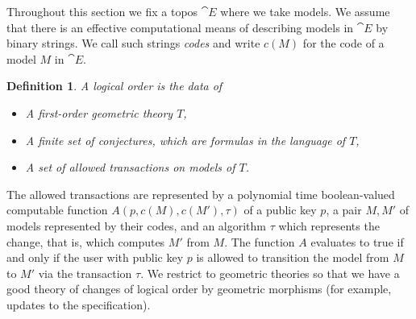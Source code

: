 \documentclass[english,letter paper,12pt,reqno]{article}
\theoremstyle{example}
\newtheorem{definition}[theorem]{Definition}
\newtheorem{example}[theorem]{Example}
\begin{document}
Throughout this section we fix a topos $\cat{E}$ where we take models. We assume that there is an effective computational means of describing models in $\cat{E}$ by binary strings. We call such strings \emph{codes} and write $c(M)$ for the code of a model $M$ in $\cat{E}$.

\begin{definition} A \emph{logical order} is the data of
\begin{itemize}
\item A first-order geometric theory $T$,
\item A finite set of \emph{conjectures}, which are formulas in the language of $T$,
\item A set of \emph{allowed transactions} on models of $T$.
\end{itemize}
\end{definition}

The allowed transactions are represented by a polynomial time boolean-valued computable function $A(p,c(M),c(M'),\tau)$ of a public key $p$, a pair $M,M'$ of models represented by their codes, and an algorithm $\tau$ which represents the change, that is, which computes $M'$ from $M$. The function $A$ evaluates to true if and only if the user with public key $p$ is allowed to transition the model from $M$ to $M'$ via the transaction $\tau$. We restrict to geometric theories so that we have a good theory of changes of logical order by geometric morphisms (for example, updates to the specification). %
\\


\end{document}
